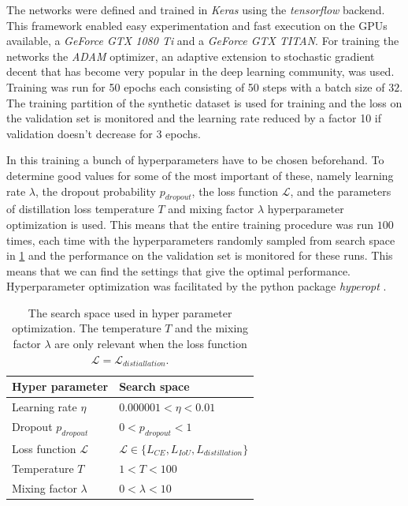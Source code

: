 \documentclass{kththesis}
\begin{document}
The networks were defined and trained in \textit{Keras} \parencite{keras} using the
\textit{tensorflow} \parencite{tensorflow} backend. This framework enabled easy
experimentation and fast execution on the GPUs available, a \textit{GeForce GTX
  1080 Ti} and a \textit{GeForce GTX TITAN}. For training the networks the
\textit{ADAM} optimizer\parencite{ADAM}, an adaptive extension to stochastic
gradient decent that has become very popular in the deep learning community, was
used. Training was run for 50 epochs each consisting of 50 steps with a batch
size of \(32\). The training partition of the synthetic dataset is used for
training and the loss on the validation set is monitored and the learning rate
reduced by a factor 10 if validation doesn't decrease for \(3\) epochs.

In this training a bunch of hyperparameters have to be chosen beforehand. To
determine good values for some of the most important of these, namely
learning rate \(\lambda\), the dropout probability \(p_{dropout}\), the
loss function \(\mathcal{L}\), and the parameters of distillation loss
temperature \(T\) and mixing factor \(\lambda\) hyperparameter optimization is
used. This means that the entire training procedure was run \(100\) times, each
time with the hyperparameters randomly sampled from search space in
\cref{tab:search_space} and the performance on the validation set is monitored
for these runs. This means that we can find the settings that give the optimal
performance. Hyperparameter optimization was facilitated by the python package
\textit{hyperopt} \parencite{hyperopt}.

\begin{table}[]
\centering
\caption{The search space used in hyper parameter optimization. The temperature
  \(T\) and the mixing factor \(\lambda\) are only relevant when the loss
  function \(\mathcal{L} = \mathcal{L}_{distiallation}\).}
\label{tab:search_space}
\begin{tabular}{@{}ll@{}}
\toprule
Hyper parameter     & Search space \\ \midrule
Learning rate \(\eta\)      &      \(0.000001 < \eta < 0.01\)        \\
Dropout \(p_{dropout}\)&  \( 0 < p_{dropout} < 1\)            \\
Loss function \(\mathcal{L}\)    &    \(\mathcal{L} \in \{L_{CE},L_{IoU}, L_{distillation}\}\)          \\
Temperature \(T\)        &      \( 1 < T < 100\)        \\
Mixing factor \(\lambda\)      &     \(0< \lambda <10\)         \\ \bottomrule
\end{tabular}
\end{table}
\end{document}
